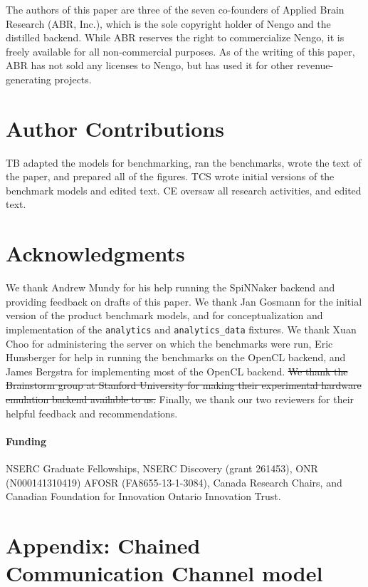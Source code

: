 \documentclass{frontiersSCNS}
\providecommand{\DIFdel}[1]{{\protect\color{red}\sout{#1}}}                      %
\providecommand{\DIFdelbegin}{} %
\providecommand{\DIFdelend}{} %
\begin{document}
The authors of this paper
are three of the seven co-founders
of Applied Brain Research (ABR, Inc.),
which is the sole copyright holder
of Nengo and the distilled backend.
While ABR reserves the right
to commercialize Nengo,
it is freely available
for all non-commercial purposes.
As of the writing of this paper,
ABR has not sold any licenses to Nengo,
but has used it
for other revenue-generating projects.

\section*{Author Contributions}

TB adapted the models for benchmarking,
ran the benchmarks,
wrote the text of the paper,
and prepared all of the figures.
TCS wrote initial versions of the benchmark models
and edited text.
CE oversaw all research activities,
and edited text.

\section*{Acknowledgments}

We thank Andrew Mundy for his help
running the SpiNNaker backend
and providing feedback on drafts of this paper.
We thank Jan Gosmann for the initial version
of the product benchmark models,
and for conceptualization and implementation
of the \texttt{analytics} and \texttt{analytics\_data}
fixtures.
We thank Xuan Choo for administering
the server on which the benchmarks were run,
Eric Hunsberger for help in running
the benchmarks on the OpenCL backend,
and James Bergstra for
implementing most of the OpenCL backend.
\DIFdelbegin \DIFdel{We thank the Brainstorm group
at Stanford University for making
their experimental hardware emulation backend
available to us.
}\DIFdelend Finally, we thank our two reviewers for
their helpful feedback and recommendations.

\paragraph{Funding\textcolon}
NSERC Graduate Fellowships,
NSERC Discovery (grant 261453),
ONR (N000141310419)
AFOSR (FA8655-13-1-3084),
Canada Research Chairs,
and Canadian Foundation for Innovation
Ontario Innovation Trust.




\clearpage

\section*{Appendix: Chained Communication Channel model}
\end{document}
